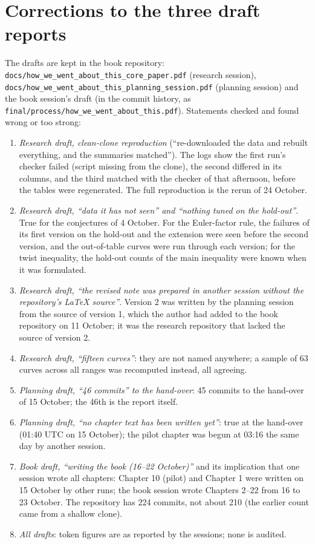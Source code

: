 \documentclass[11pt,a4paper]{article}
\begin{document}
\appendix
\section{Corrections to the three draft reports}\label{app:factcheck}
The drafts are kept in the book repository: \texttt{docs/how\_we\_went\_about\_this\_core\_paper.pdf} (research session), \texttt{docs/how\_we\_went\_about\_this\_planning\_session.pdf} (planning session) and the book session's draft (in the commit history, as \texttt{final/process/how\_we\_went\_about\_this.pdf}). Statements checked and found wrong or too strong:
\begin{enumerate}
\item \emph{Research draft, clean-clone reproduction} (``re-downloaded the data and rebuilt everything, and the summaries matched''). The logs show the first run's checker failed (script missing from the clone), the second differed in its columns, and the third matched with the checker of that afternoon, before the tables were regenerated. The full reproduction is the rerun of 24 October.
\item \emph{Research draft, ``data it has not seen'' and ``nothing tuned on the hold-out''}. True for the conjectures of 4 October. For the Euler-factor rule, the failures of its first version on the hold-out and the extension were seen before the second version, and the out-of-table curves were run through each version; for the twist inequality, the hold-out counts of the main inequality were known when it was formulated.
\item \emph{Research draft, ``the revised note was prepared in another session without the repository's LaTeX source''}. Version 2 was written by the planning session from the source of version 1, which the author had added to the book repository on 11 October; it was the research repository that lacked the source of version 2.
\item \emph{Research draft, ``fifteen curves''}: they are not named anywhere; a sample of 63 curves across all ranges was recomputed instead, all agreeing.
\item \emph{Planning draft, ``46 commits'' to the hand-over}: 45 commits to the hand-over of 15 October; the 46th is the report itself.
\item \emph{Planning draft, ``no chapter text has been written yet''}: true at the hand-over (01:40 UTC on 15 October); the pilot chapter was begun at 03:16 the same day by another session.
\item \emph{Book draft, ``writing the book (16--22 October)''} and its implication that one session wrote all chapters: Chapter 10 (pilot) and Chapter 1 were written on 15 October by other runs; the book session wrote Chapters 2--22 from 16 to 23 October. The repository has 224 commits, not about 210 (the earlier count came from a shallow clone).
\item \emph{All drafts}: token figures are as reported by the sessions; none is audited.
\end{enumerate}
\end{document}
